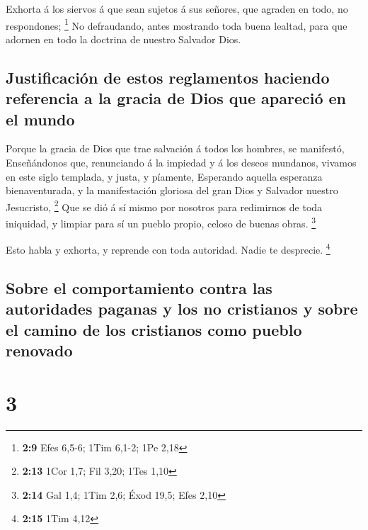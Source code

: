  Exhorta á los siervos á que sean sujetos á sus señores,
que agraden en todo, no respondones; \footnote{\textbf{2:9} Efes 6,5-6;
  1Tim 6,1-2; 1Pe 2,18}  No defraudando, antes mostrando
toda buena lealtad, para que adornen en todo la doctrina de nuestro
Salvador Dios.

\hypertarget{justificaciuxf3n-de-estos-reglamentos-haciendo-referencia-a-la-gracia-de-dios-que-apareciuxf3-en-el-mundo}{%
\subsection{Justificación de estos reglamentos haciendo referencia a la
gracia de Dios que apareció en el
mundo}\label{justificaciuxf3n-de-estos-reglamentos-haciendo-referencia-a-la-gracia-de-dios-que-apareciuxf3-en-el-mundo}}

 Porque la gracia de Dios que trae salvación á todos los
hombres, se manifestó,  Enseñándonos que, renunciando á
la impiedad y á los deseos mundanos, vivamos en este siglo templada, y
justa, y píamente,  Esperando aquella esperanza
bienaventurada, y la manifestación gloriosa del gran Dios y Salvador
nuestro Jesucristo, \footnote{\textbf{2:13} 1Cor 1,7; Fil 3,20; 1Tes
  1,10}  Que se dió á sí mismo por nosotros para
redimirnos de toda iniquidad, y limpiar para sí un pueblo propio, celoso
de buenas obras. \footnote{\textbf{2:14} Gal 1,4; 1Tim 2,6; Éxod 19,5;
  Efes 2,10}

 Esto habla y exhorta, y reprende con toda autoridad.
Nadie te desprecie. \footnote{\textbf{2:15} 1Tim 4,12}

\hypertarget{sobre-el-comportamiento-contra-las-autoridades-paganas-y-los-no-cristianos-y-sobre-el-camino-de-los-cristianos-como-pueblo-renovado}{%
\subsection{Sobre el comportamiento contra las autoridades paganas y los
no cristianos y sobre el camino de los cristianos como pueblo
renovado}\label{sobre-el-comportamiento-contra-las-autoridades-paganas-y-los-no-cristianos-y-sobre-el-camino-de-los-cristianos-como-pueblo-renovado}}

\hypertarget{section-2}{%
\section{3}\label{section-2}}

